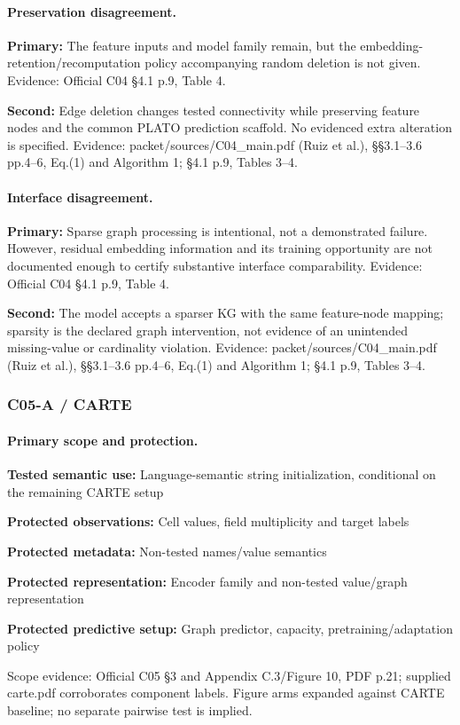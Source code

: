 \documentclass[10pt]{article}
\begin{document}
\paragraph{Preservation disagreement.}
\textbf{Primary:} The feature inputs and model family remain, but the embedding-retention/recomputation policy accompanying random deletion is not given. Evidence: Official C04 §4.1 p.9, Table 4.\par
\textbf{Second:} Edge deletion changes tested connectivity while preserving feature nodes and the common PLATO prediction scaffold. No evidenced extra alteration is specified. Evidence: packet/sources/C04\_main.pdf (Ruiz et al.), §§3.1--3.6 pp.4--6, Eq.(1) and Algorithm 1; §4.1 p.9, Tables 3--4.\par
\paragraph{Interface disagreement.}
\textbf{Primary:} Sparse graph processing is intentional, not a demonstrated failure. However, residual embedding information and its training opportunity are not documented enough to certify substantive interface comparability. Evidence: Official C04 §4.1 p.9, Table 4.\par
\textbf{Second:} The model accepts a sparser KG with the same feature-node mapping; sparsity is the declared graph intervention, not evidence of an unintended missing-value or cardinality violation. Evidence: packet/sources/C04\_main.pdf (Ruiz et al.), §§3.1--3.6 pp.4--6, Eq.(1) and Algorithm 1; §4.1 p.9, Tables 3--4.\par
\subsubsection*{C05-A / CARTE}
\paragraph{Primary scope and protection.}
\textbf{Tested semantic use:} Language-semantic string initialization, conditional on the remaining CARTE setup\par
\textbf{Protected observations:} Cell values, field multiplicity and target labels\par
\textbf{Protected metadata:} Non-tested names/value semantics\par
\textbf{Protected representation:} Encoder family and non-tested value/graph representation\par
\textbf{Protected predictive setup:} Graph predictor, capacity, pretraining/adaptation policy\par
Scope evidence: Official C05 §3 and Appendix C.3/Figure 10, PDF p.21; supplied carte.pdf corroborates component labels. Figure arms expanded against CARTE baseline; no separate pairwise test is implied.\par
\end{document}

